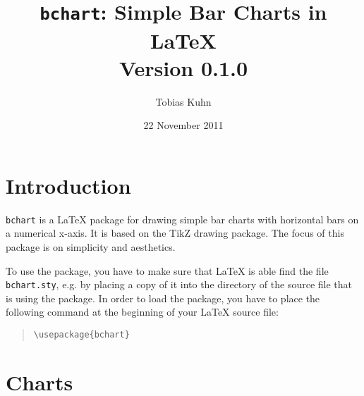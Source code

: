\documentclass{article}
\title{
  \texttt{bchart}: Simple Bar Charts in \LaTeX
  \medskip\\
  \large Version 0.1.0
}
\author{Tobias Kuhn}
\date{22 November 2011}
\begin{document}
\maketitle


\section{Introduction}

\texttt{bchart} is a {\LaTeX} package for drawing simple bar charts with horizontal bars on a numerical x-axis. It is based on the TikZ drawing package. The focus of this package is on simplicity and aesthetics.

To use the package, you have to make sure that {\LaTeX} is able find the file \texttt{bchart.sty}, e.g. by placing a copy of it into the directory of the source file that is using the package. In order to load the package, you have to place the following command at the beginning of your {\LaTeX} source file:
\begin{quote}\small
\begin{verbatim}
\usepackage{bchart}
\end{verbatim}
\end{quote}


\section{Charts}
\end{document}

